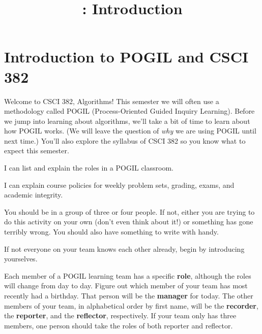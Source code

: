 \documentclass{tufte-handout}
\title{\thecourse: Introduction}
\date{}
\begin{document}
\maketitle

\section{Introduction to POGIL and CSCI 382}

Welcome to CSCI 382, Algorithms!  This semester we will often use a
methodology called POGIL (Process-Oriented Guided Inquiry
Learning). Before we jump into
learning about algorithms, we'll take a bit of time to learn about how
POGIL works. (We will leave the question of \emph{why} we are using
POGIL until next time.)  You'll also explore the syllabus of CSCI 382
so you know what to expect this semester.

\newcommand{\lobjectiveA}{I can list and explain the roles in a POGIL
  classroom.}
\begin{objective}
  \lobjectiveA
\end{objective}

\newcommand{\lobjectiveB}{I can explain course
  policies for weekly problem sets, grading, exams, and academic
  integrity.}

\begin{objective}
  \lobjectiveB
\end{objective}

You should be in a group of three or four people.  If not, either you
are trying to do this activity on your own (don't even think about
it!) or something has gone terribly wrong.  You should also have
something to write with handy.

\begin{questions}
\item If not everyone on your team knows each other already, begin by
  introducing yourselves.
\end{questions}

Each member of a POGIL learning team has a specific \textbf{role},
although the roles will change from day to day.  Figure out which
member of your team has most recently had a birthday.  That person
will be the \textbf{manager} for today. The other members of your
team, in alphabetical order by first name, will be the
\textbf{recorder}, the \textbf{reporter}, and the \textbf{reflector},
respectively.  If your team only has three members, one person should
take the roles of both reporter and reflector.
\end{document}
